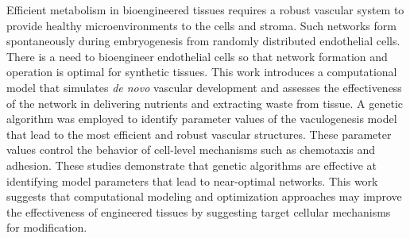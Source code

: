 Efficient metabolism in bioengineered tissues requires a robust vascular system to
provide healthy microenvironments to the cells and stroma. Such networks form
spontaneously during embryogenesis from randomly distributed endothelial cells. There
is a need to bioengineer endothelial cells so that network formation and operation is
optimal for synthetic tissues. This work introduces a computational model that
simulates \textit{de novo} vascular development and assesses the effectiveness of the
network in delivering nutrients and extracting waste from tissue. A genetic algorithm
was employed to identify parameter values of the vaculogenesis model that lead to the
most efficient and robust vascular structures. These parameter values control the
behavior of cell-level mechanisms such as chemotaxis and adhesion. These studies
demonstrate that genetic algorithms are effective at identifying model parameters
that lead to near-optimal networks. This work suggests that computational modeling
and optimization approaches may improve the effectiveness of engineered tissues by
suggesting target cellular mechanisms for modification.
